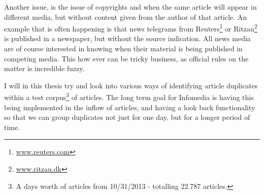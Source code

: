 Another issue, is the issue of copyrights and when the same article will appear in different media, but without content given from the author of that article. An example that is often happening is that news telegrams from Reuters\footnote{\url{www.reuters.com}} or Ritzau\footnote{\url{www.ritzau.dk}} is published in a newspaper, but without the source indication. All news media are of course interested in knowing when their material is being published in competing media. This how ever can be tricky business, as official rules on the matter is incredible fuzzy.

I will in this thesis try and look into various ways of identifying article duplicates within a test corpus\footnote{A days worth of articles from 10/31/2013 - totalling 22.787 articles.} of articles. The long term goal for Infomedia is having this being implemented in the inflow of articles, and having a look back functionality so that we can group duplicates not just for one day, but for a longer period of time. 
